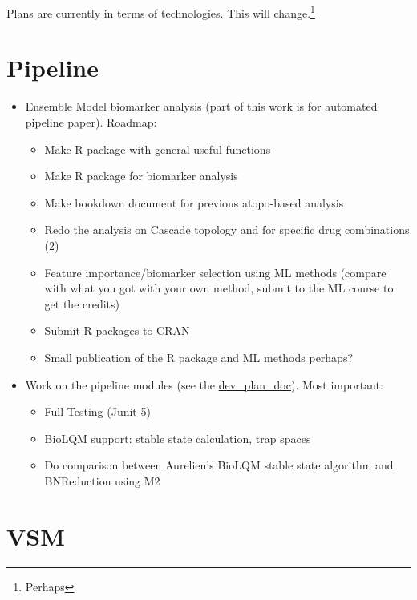 \documentclass[12pt,]{book}
\providecommand{\tightlist}{%
  \setlength{\itemsep}{0pt}\setlength{\parskip}{0pt}}
\let\rmarkdownfootnote\footnote%
\def\footnote{\protect\rmarkdownfootnote}
\theoremstyle{definition}
\theoremstyle{definition}
\theoremstyle{definition}
\theoremstyle{remark}
\begin{document}
Plans are currently in terms of technologies. This will change.\footnote{Perhaps}

\hypertarget{pipeline-1}{%
\section{Pipeline}\label{pipeline-1}}

\begin{itemize}
\tightlist
\item
  Ensemble Model biomarker analysis (part of this work is for automated pipeline
  paper). Roadmap:

  \begin{itemize}
  \tightlist
  \item
    Make R package with general useful functions
  \item
    Make R package for biomarker analysis
  \item
    Make bookdown document for previous atopo-based analysis
  \item
    Redo the analysis on Cascade topology and for specific drug combinations (2)
  \item
    Feature importance/biomarker selection using ML methods (compare with what
    you got with your own method, submit to the ML course to get the credits)
  \item
    Submit R packages to CRAN
  \item
    Small publication of the R package and ML methods perhaps?
  \end{itemize}
\item
  Work on the pipeline modules (see the \href{https://docs.google.com/document/d/1OUupR0b-28YB9pVAww77RMecnFN6A39MYjXMjljmvG4/edit?usp=sharing}{dev\_plan\_doc}). Most important:

  \begin{itemize}
  \tightlist
  \item
    Full Testing (Junit 5)
  \item
    BioLQM support: stable state calculation, trap spaces
  \item
    Do comparison between Aurelien's BioLQM stable state algorithm and
    BNReduction using M2
  \end{itemize}
\end{itemize}

\hypertarget{vsm-1}{%
\section{VSM}\label{vsm-1}}
\end{document}
